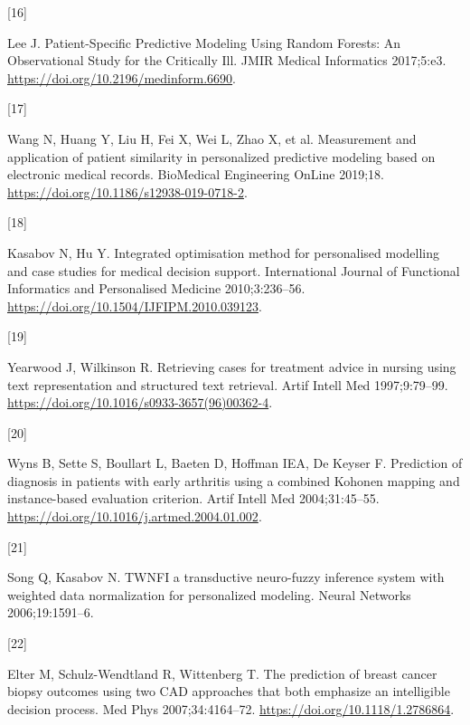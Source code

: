 \documentclass[preprint, 3p,
authoryear]{elsarticle} %
\newlength{\cslhangindent}
\newlength{\csllabelwidth}
\newlength{\cslentryspacingunit} %
\newenvironment{CSLReferences}[2] %
 {%
  \setlength{\parindent}{0pt}
  \ifodd #1
  \let\oldpar\par
  \def\par{\hangindent=\cslhangindent\oldpar}
  \fi
  \setlength{\parskip}{#2\cslentryspacingunit}
 }%
 {}
\newcommand{\CSLLeftMargin}[1]{\parbox[t]{\csllabelwidth}{#1}}
\newcommand{\CSLRightInline}[1]{\parbox[t]{\linewidth - \csllabelwidth}{#1}\break}
\begin{document}
\begin{CSLReferences}{0}{0}
\leavevmode{}%
\CSLLeftMargin{{[}16{]} }%
\CSLRightInline{Lee J. Patient-{Specific Predictive Modeling Using
Random Forests}: {An Observational Study} for the {Critically Ill}. JMIR
Medical Informatics 2017;5:e3.
\url{https://doi.org/10.2196/medinform.6690}.}

\leavevmode{}%
\CSLLeftMargin{{[}17{]} }%
\CSLRightInline{Wang N, Huang Y, Liu H, Fei X, Wei L, Zhao X, et al.
Measurement and application of patient similarity in personalized
predictive modeling based on electronic medical records. BioMedical
Engineering OnLine 2019;18.
\url{https://doi.org/10.1186/s12938-019-0718-2}.}

\leavevmode{}%
\CSLLeftMargin{{[}18{]} }%
\CSLRightInline{Kasabov N, Hu Y. Integrated optimisation method for
personalised modelling and case studies for medical decision support.
International Journal of Functional Informatics and Personalised
Medicine 2010;3:236--56.
\url{https://doi.org/10.1504/IJFIPM.2010.039123}.}

\leavevmode{}%
\CSLLeftMargin{{[}19{]} }%
\CSLRightInline{Yearwood J, Wilkinson R. Retrieving cases for treatment
advice in nursing using text representation and structured text
retrieval. Artif Intell Med 1997;9:79--99.
\url{https://doi.org/10.1016/s0933-3657(96)00362-4}.}

\leavevmode{}%
\CSLLeftMargin{{[}20{]} }%
\CSLRightInline{Wyns B, Sette S, Boullart L, Baeten D, Hoffman IEA, De
Keyser F. Prediction of diagnosis in patients with early arthritis using
a combined {Kohonen} mapping and instance-based evaluation criterion.
Artif Intell Med 2004;31:45--55.
\url{https://doi.org/10.1016/j.artmed.2004.01.002}.}

\leavevmode{}%
\CSLLeftMargin{{[}21{]} }%
\CSLRightInline{Song Q, Kasabov N. {TWNFI} \textemdash{} a transductive
neuro-fuzzy inference system with weighted data normalization for
personalized modeling. Neural Networks 2006;19:1591--6.}

\leavevmode{}%
\CSLLeftMargin{{[}22{]} }%
\CSLRightInline{Elter M, Schulz-Wendtland R, Wittenberg T. The
prediction of breast cancer biopsy outcomes using two {CAD} approaches
that both emphasize an intelligible decision process. Med Phys
2007;34:4164--72. \url{https://doi.org/10.1118/1.2786864}.}


\end{CSLReferences}
\end{document}

